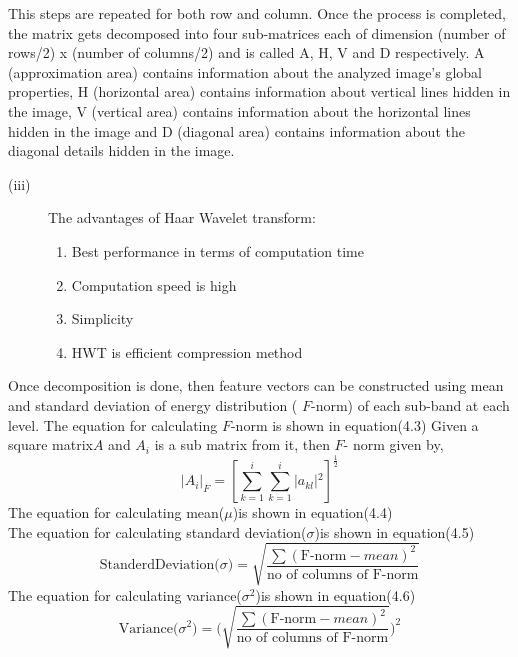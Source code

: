 This steps are repeated for both row and column. Once the process is completed, the matrix gets decomposed into four sub-matrices each of dimension (number of rows/2) x (number of
columns/2) and is called A, H, V and D respectively. A (approximation area) contains
information about the analyzed image’s global properties, H (horizontal area) contains
information about vertical lines hidden in the image, V (vertical area) contains information about the horizontal lines hidden in the image and D (diagonal area) contains information about the diagonal details hidden in the image.
\begin{description}
\item[(iii)] The advantages of Haar Wavelet transform: 
\begin{enumerate}
\item  Best performance in terms of computation time 
\item Computation speed is high 
\item Simplicity 
 \item HWT is efficient compression method
\end{enumerate}
\end{description} 
Once decomposition is done, then feature vectors can be constructed using mean and standard
deviation of energy distribution ( $F$-norm) of each sub-band at each level. The equation for calculating $F$-norm  is shown in equation(4.3)
Given a square matrix$A$ and $A_i$ is  a sub matrix from it, then $F$- norm given by,
\begin{equation}
|A_i|_{F} =\left[ \sum\limits_{k=1}^i \sum\limits_{k=1}^i|a_{kl}|{^2} \right]^{\frac{1}{2}}
\end{equation}
The equation for calculating mean($\mu$)is shown in equation(4.4)
 \begin{equation}
\end{equation}
The equation for calculating standard deviation($\sigma$)is shown in equation(4.5)
 \begin{equation}
\text{StanderdDeviation($\sigma$)} = \sqrt{\frac{\sum \left(\text{F-norm}- mean\right)^2}{\text{no of columns of F-norm}}}
\end{equation}
The equation for calculating variance($\sigma^{2}$)is shown in equation(4.6)
 \begin{equation}
\text{Variance($\sigma^{2}$)} = \Bigg(\sqrt{\frac{\sum \left(\text{F-norm}- mean\right)^2}{\text{no of columns of F-norm}}}\Bigg)^{2}
\end{equation}

